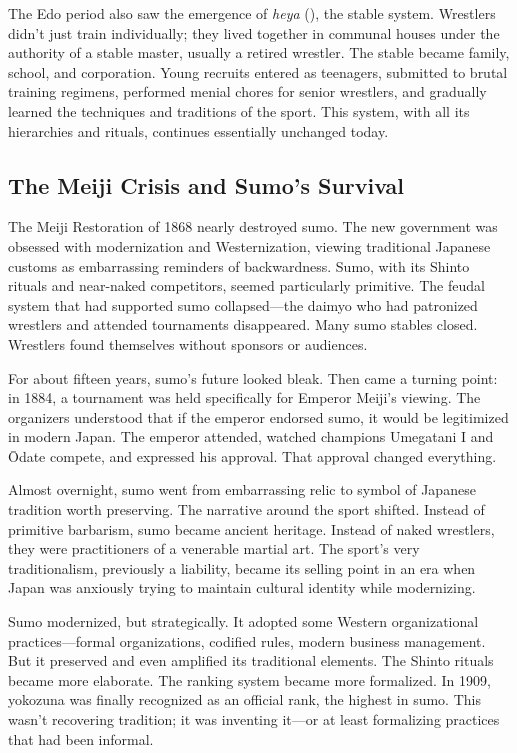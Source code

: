 The Edo period also saw the emergence of \textit{heya} (), the stable system. Wrestlers didn't just train individually; they lived together in communal houses under the authority of a stable master, usually a retired wrestler. The stable became family, school, and corporation. Young recruits entered as teenagers, submitted to brutal training regimens, performed menial chores for senior wrestlers, and gradually learned the techniques and traditions of the sport. This system, with all its hierarchies and rituals, continues essentially unchanged today.

\subsection{The Meiji Crisis and Sumo's Survival}

The Meiji Restoration of 1868 nearly destroyed sumo. The new government was obsessed with modernization and Westernization, viewing traditional Japanese customs as embarrassing reminders of backwardness. Sumo, with its Shinto rituals and near-naked competitors, seemed particularly primitive. The feudal system that had supported sumo collapsed—the daimyo who had patronized wrestlers and attended tournaments disappeared. Many sumo stables closed. Wrestlers found themselves without sponsors or audiences.

For about fifteen years, sumo's future looked bleak. Then came a turning point: in 1884, a tournament was held specifically for Emperor Meiji's viewing. The organizers understood that if the emperor endorsed sumo, it would be legitimized in modern Japan. The emperor attended, watched champions Umegatani I and Ōdate compete, and expressed his approval. That approval changed everything.

Almost overnight, sumo went from embarrassing relic to symbol of Japanese tradition worth preserving. The narrative around the sport shifted. Instead of primitive barbarism, sumo became ancient heritage. Instead of naked wrestlers, they were practitioners of a venerable martial art. The sport's very traditionalism, previously a liability, became its selling point in an era when Japan was anxiously trying to maintain cultural identity while modernizing.

Sumo modernized, but strategically. It adopted some Western organizational practices—formal organizations, codified rules, modern business management. But it preserved and even amplified its traditional elements. The Shinto rituals became more elaborate. The ranking system became more formalized. In 1909, yokozuna was finally recognized as an official rank, the highest in sumo. This wasn't recovering tradition; it was inventing it—or at least formalizing practices that had been informal.

